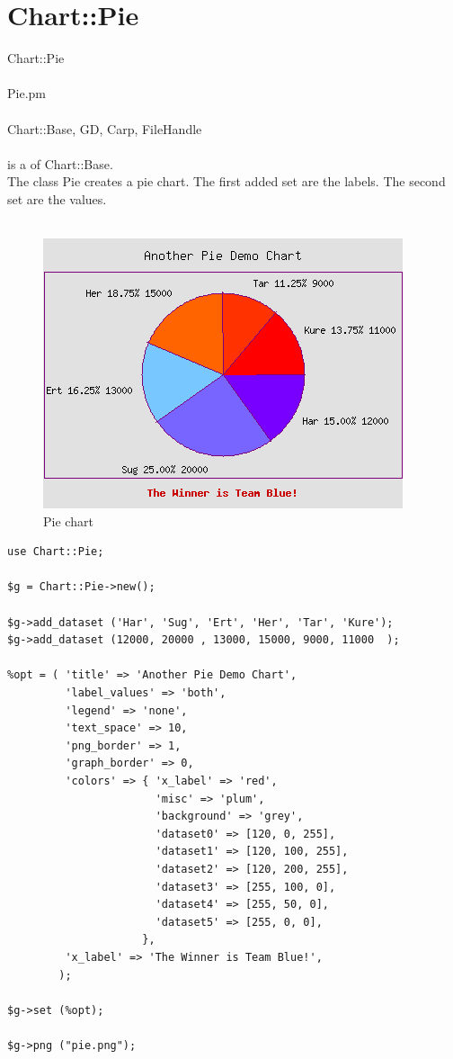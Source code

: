 \section{Chart::Pie}
 Chart::Pie\\ \\
 Pie.pm\\ \\
Chart::Base, GD, Carp, FileHandle\\ \\
  is a  of Chart::Base.\\
The class Pie creates a pie chart. The first added set are the labels. The second set are the values.\\
\\
\begin{figure}[h]
	\begin{center}
		\includegraphics[scale = 0.6]{d_pie3.png}
	\end{center}
	\caption{Pie chart}
	\label{fig:pie}
\end{figure}
\begin{verbatim}
use Chart::Pie;

$g = Chart::Pie->new();

$g->add_dataset ('Har', 'Sug', 'Ert', 'Her', 'Tar', 'Kure');
$g->add_dataset (12000, 20000 , 13000, 15000, 9000, 11000  );

%opt = ( 'title' => 'Another Pie Demo Chart',
         'label_values' => 'both',
         'legend' => 'none',
         'text_space' => 10,
         'png_border' => 1,
         'graph_border' => 0,
         'colors' => { 'x_label' => 'red',
                       'misc' => 'plum',
                       'background' => 'grey',
                       'dataset0' => [120, 0, 255],
                       'dataset1' => [120, 100, 255],
                       'dataset2' => [120, 200, 255],
                       'dataset3' => [255, 100, 0],
                       'dataset4' => [255, 50, 0],
                       'dataset5' => [255, 0, 0],
                     },
         'x_label' => 'The Winner is Team Blue!',
        );

$g->set (%opt);

$g->png ("pie.png");
\end{verbatim}
